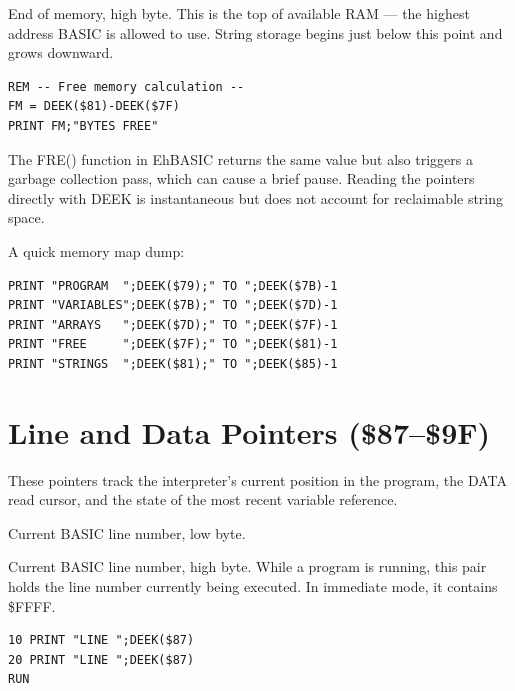 
End of memory, high byte.  This is the top of available RAM --- the highest
address BASIC is allowed to use.  String storage begins just below this point
and grows downward.

\begin{lstlisting}
REM -- Free memory calculation --
FM = DEEK($81)-DEEK($7F)
PRINT FM;"BYTES FREE"
\end{lstlisting}

\begin{notebox}
The FRE() function in EhBASIC returns the same value but also triggers a
garbage collection pass, which can cause a brief pause.  Reading the pointers
directly with DEEK is instantaneous but does not account for reclaimable
string space.
\end{notebox}

\begin{tipbox}
A quick memory map dump:
\begin{lstlisting}
PRINT "PROGRAM  ";DEEK($79);" TO ";DEEK($7B)-1
PRINT "VARIABLES";DEEK($7B);" TO ";DEEK($7D)-1
PRINT "ARRAYS   ";DEEK($7D);" TO ";DEEK($7F)-1
PRINT "FREE     ";DEEK($7F);" TO ";DEEK($81)-1
PRINT "STRINGS  ";DEEK($81);" TO ";DEEK($85)-1
\end{lstlisting}
\end{tipbox}

\section{Line and Data Pointers (\$87--\$9F)}

These pointers track the interpreter's current position in the program, the
DATA read cursor, and the state of the most recent variable reference.


Current BASIC line number, low byte.


Current BASIC line number, high byte.  While a program is running, this pair
holds the line number currently being executed.  In immediate mode, it
contains \$FFFF.

\begin{lstlisting}
10 PRINT "LINE ";DEEK($87)
20 PRINT "LINE ";DEEK($87)
RUN
\end{lstlisting}


